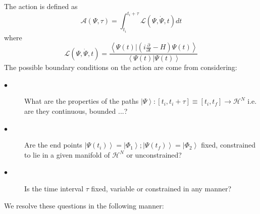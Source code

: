 \documentclass[aps,preprint]{revtex4}
\begin{document}
The action is defined as%
\begin{equation}
\mathcal{A}\left( \Psi ,\tau \right) =\int_{t_{i}}^{t_{i}+\tau }\mathcal{L}%
\left( \Psi ,\dot{\Psi},t\right) dt
\end{equation}%
where 
\begin{equation}
\mathcal{L}\left( \Psi ,\dot{\Psi},t\right) =\frac{\left\langle \Psi \left(
t\right) |\left( i\frac{\partial }{\partial t}-H\right) \Psi \left( t\right)
\right\rangle }{\left\langle \Psi \left( t\right) |\Psi \left( t\right)
\right\rangle }
\end{equation}%
The possible boundary conditions on the action are come from considering:

\begin{description}
\item[$\bullet $] What are the properties of the paths $\left\vert \Psi
\right\rangle :\left[ t_{i},t_{i}+\tau \right] \equiv \left[ t_{i},t_{f}%
\right] \rightarrow \mathcal{H}^{N}$ i.e. are they continuous, bounded ...?

\item[$\bullet $] Are the end points $\left\vert \Psi \left( t_{i}\right)
\right\rangle =\left\vert \Phi _{1}\right\rangle ;\left\vert \Psi \left(
t_{f}\right) \right\rangle =\left\vert \Phi _{2}\right\rangle $ fixed,
constrained to lie in a given manifold of $\mathcal{H}^{N}$ or unconstrained?

\item[$\bullet $] Is the time interval $\tau $ fixed, variable or
constrained in any manner?
\end{description}

We resolve these questions in the following manner:
\end{document}
